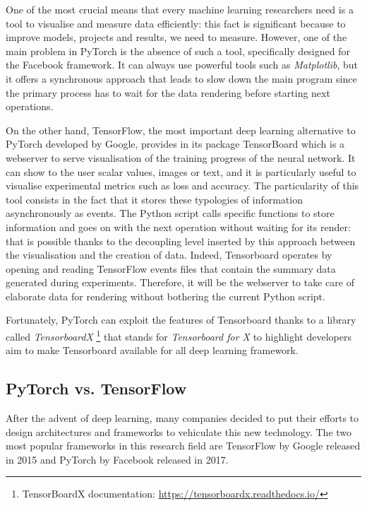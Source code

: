 One of the most crucial means that every machine learning researchers need is a tool to visualise and measure data efficiently: this fact is significant because to improve models, projects and results, we need to measure.
However, one of the main problem in PyTorch is the absence of such a tool, specifically designed for the Facebook framework. It can always use powerful tools such as \textit{Matplotlib}, but it offers a synchronous approach that leads to slow down the main program since the primary process has to wait for the data rendering before starting next operations.

On the other hand, TensorFlow, the most important deep learning alternative to PyTorch developed by Google, provides in its package TensorBoard which is a webserver to serve visualisation of the training progress of the neural network. It can show to the user scalar values, images or text, and it is particularly useful to visualise experimental metrics such as loss and accuracy. The particularity of this tool consists in the fact that it stores these typologies of information asynchronously as events.
The Python script calls specific functions to store information and goes on with the next operation without waiting for its render: that is possible thanks to the decoupling level inserted by this approach between the visualisation and the creation of data. Indeed, Tensorboard operates by opening and reading  TensorFlow events files that contain the summary data generated during experiments. Therefore, it will be the webserver to take care of elaborate data for rendering without bothering the current Python script.

Fortunately, PyTorch can exploit the features of Tensorboard thanks to a library called \textit{TensorboardX} \footnote{TensorBoardX documentation: \href{https://tensorboardx.readthedocs.io/en/latest/index.html}{https://tensorboardx.readthedocs.io/}} that stands for \textit{Tensorboard for X} to highlight developers aim to make Tensorboard available for all deep learning framework.

\subsection{PyTorch vs. TensorFlow}

After the advent of deep learning, many companies decided to put their efforts to design architectures and frameworks to vehiculate this new technology. The two most popular frameworks in this research field are TensorFlow \cite{abadi2016tensorflow} by Google released in 2015 and PyTorch \cite{paszke2017automatic}  by Facebook released in 2017.

